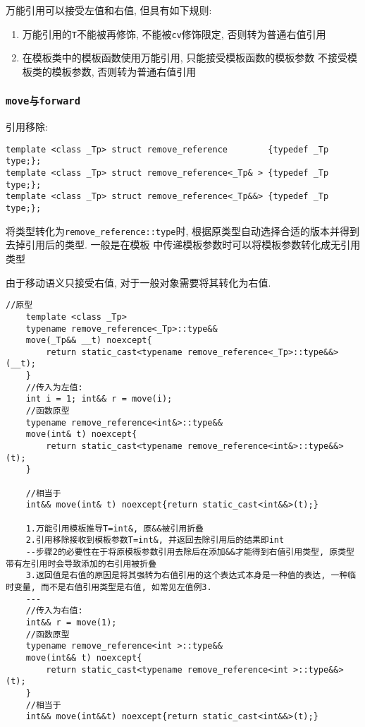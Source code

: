 万能引用可以接受左值和右值, 但具有如下规则:
\begin{enumerate}
	\item 万能引用的{\tt T}不能被再修饰, 不能被{\tt cv}修饰限定, 否则转为普通右值引用
	\item 在模板类中的模板函数使用万能引用, 只能接受模板函数的模板参数 
			不接受模板类的模板参数, 否则转为普通右值引用
\end{enumerate}
\subsubsection{\tt{move}与\tt{forward}}

引用移除:
\begin{lstlisting}[xleftmargin=2em,xrightmargin=2em]
template <class _Tp> struct remove_reference        {typedef _Tp type;};
template <class _Tp> struct remove_reference<_Tp& > {typedef _Tp type;};
template <class _Tp> struct remove_reference<_Tp&&> {typedef _Tp type;};
\end{lstlisting}
将类型转化为{\tt remove\_reference::type}时, 根据原类型自动选择合适的版本并得到去掉引用后的类型. 一般是在模板
	中传递模板参数时可以将模板参数转化成无引用类型


由于移动语义只接受右值, 对于一般对象需要将其转化为右值.

\begin{lstlisting}[title=move,xleftmargin=2em,xrightmargin=2em]
	//原型
	template <class _Tp>
	typename remove_reference<_Tp>::type&&
	move(_Tp&& __t) noexcept{
		return static_cast<typename remove_reference<_Tp>::type&&>(__t);
	}
	//传入为左值:
	int i = 1; int&& r = move(i);
	//函数原型
	typename remove_reference<int&>::type&&
	move(int& t) noexcept{
		return static_cast<typename remove_reference<int&>::type&&>(t);
	}
	
	//相当于
	int&& move(int& t) noexcept{return static_cast<int&&>(t);}
	
	1.万能引用模板推导T=int&, 原&&被引用折叠
	2.引用移除接收到模板参数T=int&, 并返回去除引用后的结果即int
	--步骤2的必要性在于将原模板参数引用去除后在添加&&才能得到右值引用类型, 原类型带有左引用时会导致添加的右引用被折叠
	3.返回值是右值的原因是将其强转为右值引用的这个表达式本身是一种值的表达, 一种临时变量, 而不是右值引用类型是右值, 如常见左值例3.
	---
	//传入为右值:
	int&& r = move(1);
	//函数原型
	typename remove_reference<int >::type&&
	move(int&& t) noexcept{
		return static_cast<typename remove_reference<int >::type&&>(t);
	}
	//相当于
	int&& move(int&&t) noexcept{return static_cast<int&&>(t);}

\end{lstlisting}

